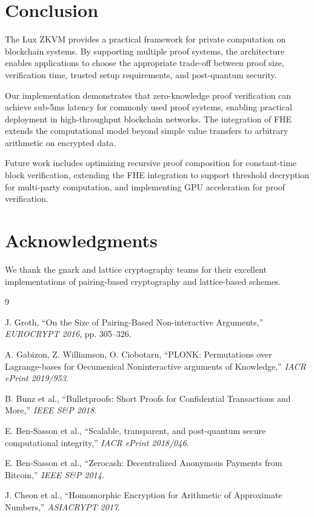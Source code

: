 \documentclass[11pt,a4paper]{article}
\begin{document}
\section{Conclusion}

The Lux ZKVM provides a practical framework for private computation on blockchain systems. By supporting multiple proof systems, the architecture enables applications to choose the appropriate trade-off between proof size, verification time, trusted setup requirements, and post-quantum security.

Our implementation demonstrates that zero-knowledge proof verification can achieve sub-5ms latency for commonly used proof systems, enabling practical deployment in high-throughput blockchain networks. The integration of FHE extends the computational model beyond simple value transfers to arbitrary arithmetic on encrypted data.

Future work includes optimizing recursive proof composition for constant-time block verification, extending the FHE integration to support threshold decryption for multi-party computation, and implementing GPU acceleration for proof verification.

\section*{Acknowledgments}

We thank the gnark and lattice cryptography teams for their excellent implementations of pairing-based cryptography and lattice-based schemes.


\begin{thebibliography}{9}

J. Groth, ``On the Size of Pairing-Based Non-interactive Arguments,'' \textit{EUROCRYPT 2016}, pp. 305--326.

A. Gabizon, Z. Williamson, O. Ciobotaru, ``PLONK: Permutations over Lagrange-bases for Oecumenical Noninteractive arguments of Knowledge,'' \textit{IACR ePrint 2019/953}.

B. Bunz et al., ``Bulletproofs: Short Proofs for Confidential Transactions and More,'' \textit{IEEE S\&P 2018}.

E. Ben-Sasson et al., ``Scalable, transparent, and post-quantum secure computational integrity,'' \textit{IACR ePrint 2018/046}.

E. Ben-Sasson et al., ``Zerocash: Decentralized Anonymous Payments from Bitcoin,'' \textit{IEEE S\&P 2014}.

J. Cheon et al., ``Homomorphic Encryption for Arithmetic of Approximate Numbers,'' \textit{ASIACRYPT 2017}.

\end{thebibliography}
\end{document}
